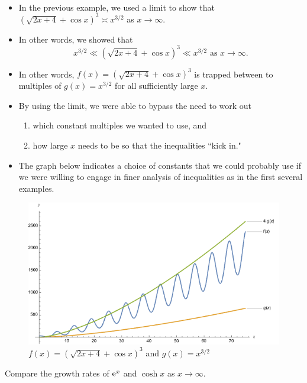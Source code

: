 \begin{remark}\,
\begin{itemize}
\item In the previous example, we used a limit to show that $(\sqrt{2x+4}+\cos x)^3\asymp x^{3/2}$ as $x\to\infty$.
\item In other words, we showed that
\begin{equation*}
x^{3/2} \ll (\sqrt{2x+4}+\cos x)^3\ll x^{3/2} \text{ as } x\to\infty.
\end{equation*}
\item In other words, $f(x) = (\sqrt{2x+4}+\cos x)^3$ is trapped between to multiples of $g(x)=x^{3/2}$ for all sufficiently large $x$.
\item By using the limit, we were able to bypass the need to work out
\begin{enumerate}
\item which constant multiples we wanted to use, and
\item how large $x$ needs to be so that the inequalities ``kick in."
\end{enumerate}
\item The graph below indicates a choice of constants that we could probably use if we were willing to engage in finer analysis of inequalities as in the first several examples.
\end{itemize}
\end{remark}

\begin{figure}[H]
\includegraphics[width=6.5in]{img/example2}\caption{$f(x) = (\sqrt{2x+4}+\cos x)^3$ and $g(x) = x^{3/2}$}
\end{figure}

\newpage

\begin{example}
Compare the growth rates of $\mathrm{e}^x$ and $\cosh x$ as $x\to\infty$.
\end{example}
\ifdefined\SOLUTION
{}
\else
\fi
\vfill

